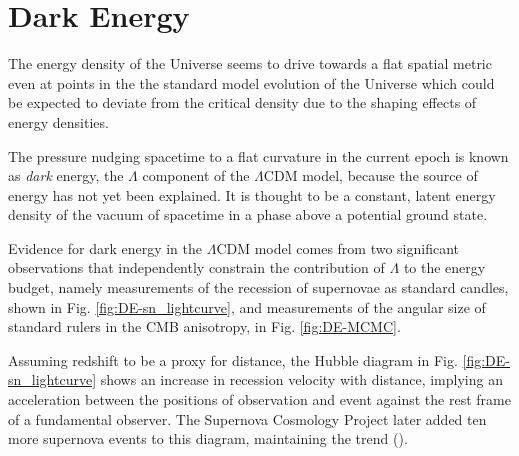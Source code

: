 \documentclass{paper}
\begin{document}
\section*{Dark Energy}
  The energy density of the Universe seems to drive towards a flat spatial 
  metric even at points in the the standard model evolution of the Universe 
  which could be expected to deviate from the critical density due to the 
  shaping effects of energy densities.

  The pressure nudging spacetime to a flat curvature in the current epoch is 
  known as \textit{dark} energy, the $\Lambda$ component of the $\Lambda$CDM
  model, because the source of energy has not yet been explained.  It is 
  thought to be a constant, latent energy density of the vacuum of spacetime 
  in a phase above a potential ground state.

  Evidence for dark energy in the $\Lambda$CDM model comes from two 
  significant observations that independently constrain the contribution of 
  $\Lambda$ to the energy budget, namely measurements of the recession of 
  supernovae as standard candles, shown in Fig. \ref{fig:DE-sn_lightcurve}, 
  and measurements of the angular size of standard rulers in the CMB 
  anisotropy, in Fig. \ref{fig:DE-MCMC}.

  Assuming redshift to be a proxy for distance, the Hubble diagram in Fig. 
  \ref{fig:DE-sn_lightcurve} shows an increase in recession velocity with 
  distance, implying an acceleration between the positions of observation and 
  event against the rest frame of a fundamental observer. The Supernova 
  Cosmology Project later added ten more supernova events to this diagram, 
  maintaining the trend (\cite{2012ApJ...746...85S}).
\end{document}
